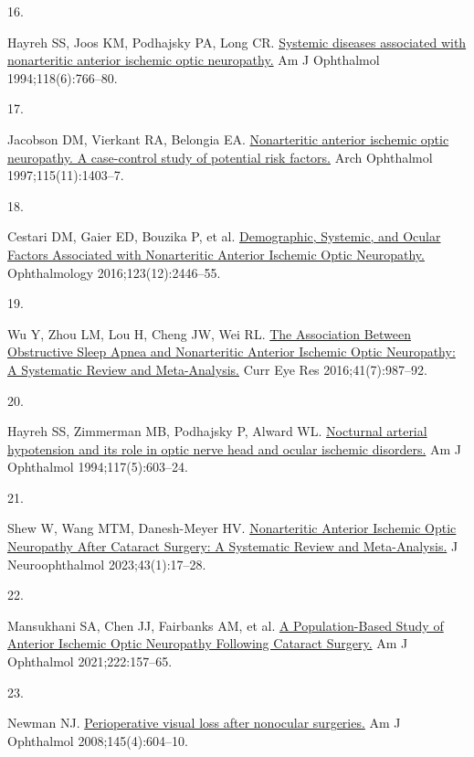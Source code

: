 \documentclass[
  11pt,
]{article}
\newlength{\cslhangindent}
\newlength{\csllabelwidth}
\newenvironment{CSLReferences}[2] %
 {\begin{list}{}{%
  \setlength{\itemindent}{0pt}
  \setlength{\leftmargin}{0pt}
  \setlength{\parsep}{0pt}
  \ifodd #1
   \setlength{\leftmargin}{\cslhangindent}
   \setlength{\itemindent}{-1\cslhangindent}
  \fi
  \setlength{\itemsep}{#2\baselineskip}}}
 {\end{list}}
\newcommand{\CSLLeftMargin}[1]{\parbox[t]{\csllabelwidth}{\strut#1\strut}}
\newcommand{\CSLRightInline}[1]{\parbox[t]{\linewidth - \csllabelwidth}{\strut#1\strut}}
\begin{document}
\begin{CSLReferences}{0}{1}
\CSLLeftMargin{16. }%
\CSLRightInline{Hayreh SS, Joos KM, Podhajsky PA, Long CR.
\href{https://doi.org/10.1016/s0002-9394(14)72557-7}{{Systemic diseases
associated with nonarteritic anterior ischemic optic neuropathy.}} Am J
Ophthalmol 1994;118(6):766--80. }

\CSLLeftMargin{17. }%
\CSLRightInline{Jacobson DM, Vierkant RA, Belongia EA.
\href{https://doi.org/10.1001/archopht.1997.01100160573008}{{Nonarteritic
anterior ischemic optic neuropathy. A case-control study of potential
risk factors.}} Arch Ophthalmol 1997;115(11):1403--7. }

\CSLLeftMargin{18. }%
\CSLRightInline{Cestari DM, Gaier ED, Bouzika P, et al.
\href{https://doi.org/10.1016/j.ophtha.2016.08.017}{{Demographic,
Systemic, and Ocular Factors Associated with Nonarteritic Anterior
Ischemic Optic Neuropathy.}} Ophthalmology 2016;123(12):2446--55. }

\CSLLeftMargin{19. }%
\CSLRightInline{Wu Y, Zhou LM, Lou H, Cheng JW, Wei RL.
\href{https://doi.org/10.3109/02713683.2015.1075221}{{The Association
Between Obstructive Sleep Apnea and Nonarteritic Anterior Ischemic Optic
Neuropathy: A Systematic Review and Meta-Analysis.}} Curr Eye Res
2016;41(7):987--92. }

\CSLLeftMargin{20. }%
\CSLRightInline{Hayreh SS, Zimmerman MB, Podhajsky P, Alward WL.
\href{https://doi.org/10.1016/s0002-9394(14)70067-4}{{Nocturnal arterial
hypotension and its role in optic nerve head and ocular ischemic
disorders.}} Am J Ophthalmol 1994;117(5):603--24. }

\CSLLeftMargin{21. }%
\CSLRightInline{Shew W, Wang MTM, Danesh-Meyer HV.
\href{https://doi.org/10.1097/WNO.0000000000001625}{{Nonarteritic
Anterior Ischemic Optic Neuropathy After Cataract Surgery: A Systematic
Review and Meta-Analysis.}} J Neuroophthalmol 2023;43(1):17--28. }

\CSLLeftMargin{22. }%
\CSLRightInline{Mansukhani SA, Chen JJ, Fairbanks AM, et al.
\href{https://doi.org/10.1016/j.ajo.2020.08.020}{{A Population-Based
Study of Anterior Ischemic Optic Neuropathy Following Cataract
Surgery.}} Am J Ophthalmol 2021;222:157--65. }

\CSLLeftMargin{23. }%
\CSLRightInline{Newman NJ.
\href{https://doi.org/10.1016/j.ajo.2007.09.016}{{Perioperative visual
loss after nonocular surgeries.}} Am J Ophthalmol 2008;145(4):604--10. }


\end{CSLReferences}
\end{document}
